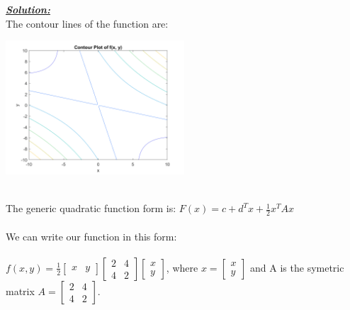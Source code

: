 \documentclass{article}
\begin{document}
\noindent \underline{\textbf{\textit{Solution:}}}
\\
The contour lines of the function are:
  \begin{center} \includegraphics[width=0.5\textwidth]{Problem1_Contour.png} \end{center}
\noindent \\The generic quadratic function form is: ${F(x) = c + d^Tx + \frac{1}{2}x^TAx}$ \\ \\We can write our function in this form: \\ \\
  $f(x,y) =
  \frac{1}{2}
  \begin{bmatrix}
    x & y
  \end{bmatrix}
  \begin{bmatrix}
    2 & 4 \\
    4 & 2
  \end{bmatrix}
  \begin{bmatrix}
    x \\
    y
  \end{bmatrix}
  $,
  where $ x = 
  \begin{bmatrix}
    x \\
    y
  \end{bmatrix}$
  and A is the symetric matrix $A =   
  \begin{bmatrix}
    2 & 4 \\
    4 & 2
  \end{bmatrix}$. \\ 
\end{document}
